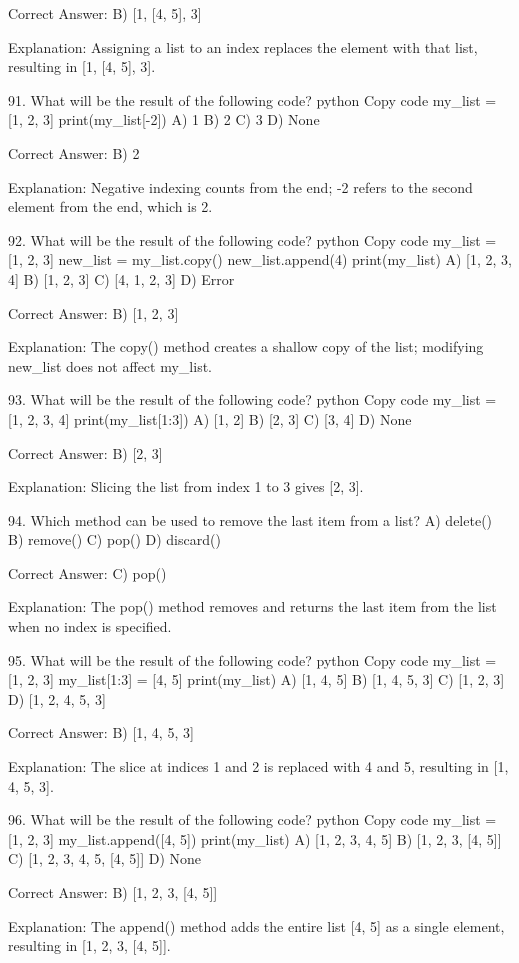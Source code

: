 Correct Answer: B) [1, [4, 5], 3]

Explanation:
Assigning a list to an index replaces the element with that list, resulting in [1, [4, 5], 3].

91. What will be the result of the following code?
python
Copy code
my_list = [1, 2, 3]
print(my_list[-2])
A) 1
B) 2
C) 3
D) None

Correct Answer: B) 2

Explanation:
Negative indexing counts from the end; -2 refers to the second element from the end, which is 2.

92. What will be the result of the following code?
python
Copy code
my_list = [1, 2, 3]
new_list = my_list.copy()
new_list.append(4)
print(my_list)
A) [1, 2, 3, 4]
B) [1, 2, 3]
C) [4, 1, 2, 3]
D) Error

Correct Answer: B) [1, 2, 3]

Explanation:
The copy() method creates a shallow copy of the list; modifying new_list does not affect my_list.

93. What will be the result of the following code?
python
Copy code
my_list = [1, 2, 3, 4]
print(my_list[1:3])
A) [1, 2]
B) [2, 3]
C) [3, 4]
D) None

Correct Answer: B) [2, 3]

Explanation:
Slicing the list from index 1 to 3 gives [2, 3].

94. Which method can be used to remove the last item from a list?
A) delete()
B) remove()
C) pop()
D) discard()

Correct Answer: C) pop()

Explanation:
The pop() method removes and returns the last item from the list when no index is specified.

95. What will be the result of the following code?
python
Copy code
my_list = [1, 2, 3]
my_list[1:3] = [4, 5]
print(my_list)
A) [1, 4, 5]
B) [1, 4, 5, 3]
C) [1, 2, 3]
D) [1, 2, 4, 5, 3]

Correct Answer: B) [1, 4, 5, 3]

Explanation:
The slice at indices 1 and 2 is replaced with 4 and 5, resulting in [1, 4, 5, 3].

96. What will be the result of the following code?
python
Copy code
my_list = [1, 2, 3]
my_list.append([4, 5])
print(my_list)
A) [1, 2, 3, 4, 5]
B) [1, 2, 3, [4, 5]]
C) [1, 2, 3, 4, 5, [4, 5]]
D) None

Correct Answer: B) [1, 2, 3, [4, 5]]

Explanation:
The append() method adds the entire list [4, 5] as a single element, resulting in [1, 2, 3, [4, 5]].


